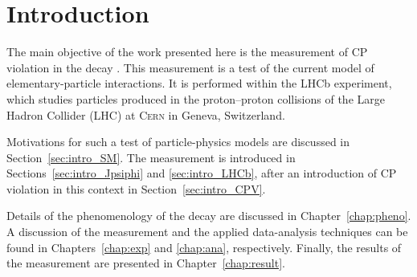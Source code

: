 \chapter{Introduction}
\label{chap:intro}

The main objective of the work presented here is the measurement of CP violation in the decay \BstoJpsiphi. This measurement is a test of
the current model of elementary-particle interactions. It is performed within the LHCb experiment, which studies particles produced in the
proton--proton collisions of the Large Hadron Collider (LHC) at \textsc{Cern} in Geneva, Switzerland.

Motivations for such a test of particle-physics models are discussed in Section~\ref{sec:intro_SM}. The measurement is introduced in
Sections~\ref{sec:intro_Jpsiphi} and \ref{sec:intro_LHCb}, after an introduction of CP violation in this context in
Section~\ref{sec:intro_CPV}.

Details of the phenomenology of the \BstoJpsiphi{} decay are discussed in Chapter~\ref{chap:pheno}. A discussion of the  measurement and
the applied data-analysis techniques can be found in Chapters~\ref{chap:exp} and \ref{chap:ana}, respectively. Finally, the results of
the measurement are presented in Chapter~\ref{chap:result}.






